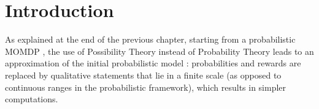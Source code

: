 \section{Introduction}
As explained at the end of the previous chapter, 
starting from a probabilistic MOMDP \cite{OngShaoHsuWee-IJRR10,AraThoBufCha-ICTAI10},
the use of Possibility Theory instead of Probability Theory 
leads to an approximation of the initial 
probabilistic model \cite{conf/ecai/Sabbadi00}:
probabilities and rewards are replaced by 
qualitative statements that lie in a finite scale 
(as opposed to continuous ranges in the probabilistic framework), 
which results in simpler computations. 
